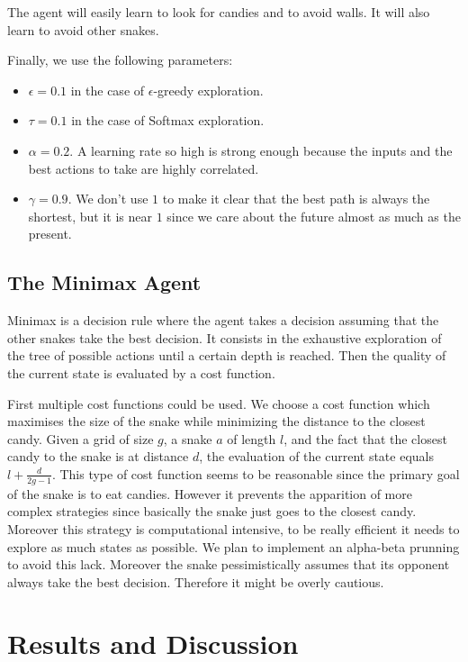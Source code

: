 \documentclass[journal, a4paper]{IEEEtran}
\begin{document}
The agent will easily learn to look for candies and to avoid walls.
It will also learn to avoid other snakes.

Finally, we use the following parameters:
\begin{itemize}
    \item $\epsilon = 0.1$ in the case of $\epsilon$-greedy exploration.
    \item $\tau = 0.1$ in the case of Softmax exploration.
    \item $\alpha = 0.2$. A learning rate so high is strong enough because the inputs and the best actions to take are highly correlated.
    \item $\gamma = 0.9$. We don't use $1$ to make it clear that the best path is always the shortest, but it is near $1$ since we care about the future almost as much as the present.
\end{itemize}

\subsection{The Minimax Agent}
Minimax is a decision rule where the agent takes a decision assuming that the other snakes take the best decision. It consists in the exhaustive exploration of the tree of possible actions until a certain depth is reached. Then the quality of the current state is evaluated by a cost function. 

First multiple cost functions could be used. We choose a cost function which maximises the size of the snake while minimizing the distance to the closest candy. Given a grid of size $g$, a snake $a$ of length $l$, and the fact that the closest candy to the snake is at distance $d$, the evaluation of the current state equals $l+\tfrac{d}{2g-1}$. This type of cost function seems to be reasonable since the primary goal of the snake is to eat candies. However it prevents the apparition of more complex strategies since basically the snake just goes to the closest candy. Moreover this strategy is computational intensive, to be really efficient it needs to explore as much states as possible. We plan to implement an alpha-beta prunning to avoid this lack. Moreover the snake pessimistically assumes that its opponent always take the best decision. Therefore it might be overly cautious.


\section{Results and Discussion}
\end{document}
